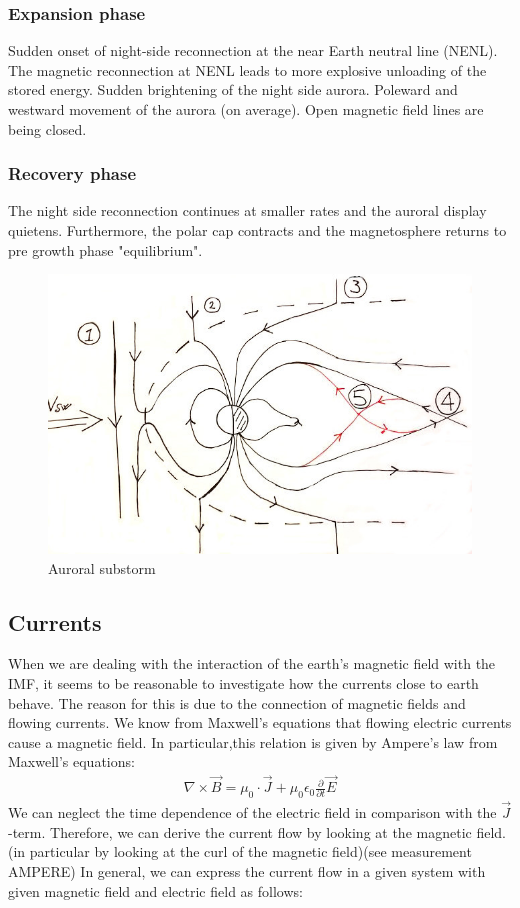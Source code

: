 \documentclass[10pt,a4paper]{article}
\begin{document}
\subsubsection{Expansion phase}
Sudden onset of night-side reconnection at the near Earth neutral line (NENL). The magnetic reconnection at NENL leads to more explosive unloading of the stored energy. 
Sudden brightening of the night side aurora. Poleward and westward movement of the 
aurora (on average). Open magnetic field lines are being closed. 
\subsubsection{Recovery phase}
The night side reconnection continues at smaller rates and the auroral display quietens. Furthermore, the polar cap contracts and the magnetosphere returns to pre 
growth phase "equilibrium". 
\begin{figure}[h]
\centering
\caption{Auroral substorm}
\label{aurora substorm}
\includegraphics[scale=0.5]{solvind2.jpg}
\end{figure}

\subsection{Currents \label{_CHAP_THEO_currents}}

When we are dealing with the interaction of the earth's magnetic field with the IMF, it seems to be reasonable to investigate how the currents close to earth behave.
The reason for this is due to the connection of magnetic fields and flowing currents. We know from Maxwell's equations that flowing electric currents cause a magnetic 
field. In particular,this relation is given by Ampere's law from Maxwell's equations:
\begin{align}
\nabla \times \vec{B}= \mu_0 \cdot \vec{J} + \mu_0 \epsilon_0 \frac{\partial }{\partial t} \vec{E}
\end{align}
We can neglect the time dependence of the electric field in comparison with the $\vec{J}$-term.  
Therefore, we can derive the current flow by looking at the magnetic field. (in particular by looking at the curl of the magnetic field)(see measurement AMPERE)
In general, we can express the current flow in a given system with given magnetic field and electric field as follows:
\end{document}
